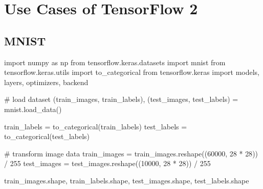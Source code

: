 \documentclass[
  letterpaper,
  DIV=11,
  numbers=noendperiod]{scrreprt}
\newenvironment{Shaded}{\begin{snugshade}}{\end{snugshade}}
\newcommand{\CommentTok}[1]{\textcolor[rgb]{0.37,0.37,0.37}{#1}}
\newcommand{\DecValTok}[1]{\textcolor[rgb]{0.68,0.00,0.00}{#1}}
\newcommand{\ImportTok}[1]{\textcolor[rgb]{0.00,0.46,0.62}{#1}}
\newcommand{\NormalTok}[1]{\textcolor[rgb]{0.00,0.23,0.31}{#1}}
\newcommand{\OperatorTok}[1]{\textcolor[rgb]{0.37,0.37,0.37}{#1}}
\begin{document}
\part{{Use Cases of TensorFlow 2}}

\hypertarget{mnist}{%
\chapter{MNIST}\label{mnist}}

\begin{Shaded}
\begin{Highlighting}[]
\ImportTok{import}\NormalTok{ numpy }\ImportTok{as}\NormalTok{ np}
\ImportTok{from}\NormalTok{ tensorflow.keras.datasets }\ImportTok{import}\NormalTok{ mnist}
\ImportTok{from}\NormalTok{ tensorflow.keras.utils }\ImportTok{import}\NormalTok{ to\_categorical}
\ImportTok{from}\NormalTok{ tensorflow.keras }\ImportTok{import}\NormalTok{ models, layers, optimizers, backend}
\end{Highlighting}
\end{Shaded}

\begin{Shaded}
\begin{Highlighting}[]
\CommentTok{\# load dataset}
\NormalTok{(train\_images, train\_labels), (test\_images, test\_labels) }\OperatorTok{=}\NormalTok{ mnist.load\_data()}

\NormalTok{train\_labels }\OperatorTok{=}\NormalTok{ to\_categorical(train\_labels)}
\NormalTok{test\_labels }\OperatorTok{=}\NormalTok{ to\_categorical(test\_labels)}

\CommentTok{\# transform image data}
\NormalTok{train\_images }\OperatorTok{=}\NormalTok{ train\_images.reshape((}\DecValTok{60000}\NormalTok{, }\DecValTok{28} \OperatorTok{*} \DecValTok{28}\NormalTok{)) }\OperatorTok{/} \DecValTok{255}
\NormalTok{test\_images }\OperatorTok{=}\NormalTok{ test\_images.reshape((}\DecValTok{10000}\NormalTok{, }\DecValTok{28} \OperatorTok{*} \DecValTok{28}\NormalTok{)) }\OperatorTok{/} \DecValTok{255}

\NormalTok{train\_images.shape, train\_labels.shape, test\_images.shape, test\_labels.shape}
\end{Highlighting}
\end{Shaded}
\end{document}
